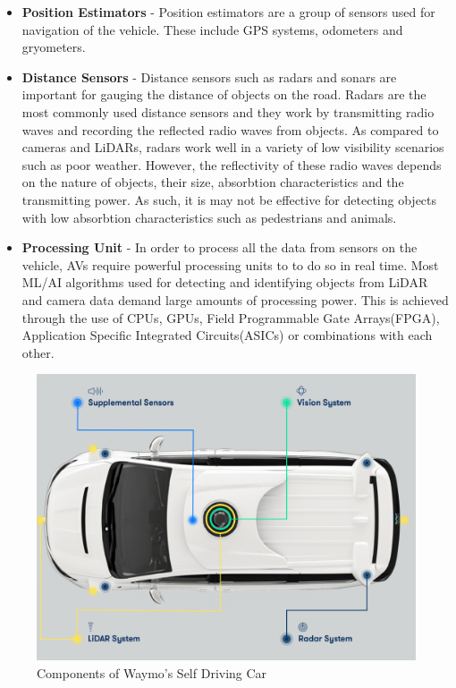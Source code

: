 \begin{itemize}
	\item \textbf{Position Estimators} - Position estimators are a group of sensors used for navigation of the vehicle. These include GPS systems, odometers and gryometers. 
	\item \textbf{Distance Sensors} - Distance sensors such as radars and sonars are important for gauging the distance of objects on the road. 
	Radars are the most commonly used distance sensors and they work by transmitting radio waves and recording the reflected radio waves from objects. As compared to cameras and LiDARs, radars work well in a variety of low visibility scenarios such as poor weather. 
	However, the reflectivity of these radio waves depends on the nature of objects, their size, absorbtion characteristics and the transmitting power. As such, it is may not be effective for detecting objects with low absorbtion characteristics such as pedestrians and animals.
	
	\item \textbf{Processing Unit} - In order to process all the data from sensors on the vehicle, AVs require powerful processing units to to do so in real time. Most ML/AI algorithms used for detecting and identifying objects from LiDAR and camera data demand large amounts of processing power. This is achieved through the use of CPUs, GPUs, Field Programmable Gate Arrays(FPGA)\cite{brown2012field}, Application Specific Integrated Circuits(ASICs)\cite{smith1997application} or combinations with each other. 

\end{itemize}


\begin{figure}[t]
	\centering
	\includegraphics[width=\textwidth]{media/waymo.png}
	\caption{Components of Waymo's Self Driving Car \cite{waymo_2018}}
	\label{fig:my_label}
\end{figure}



